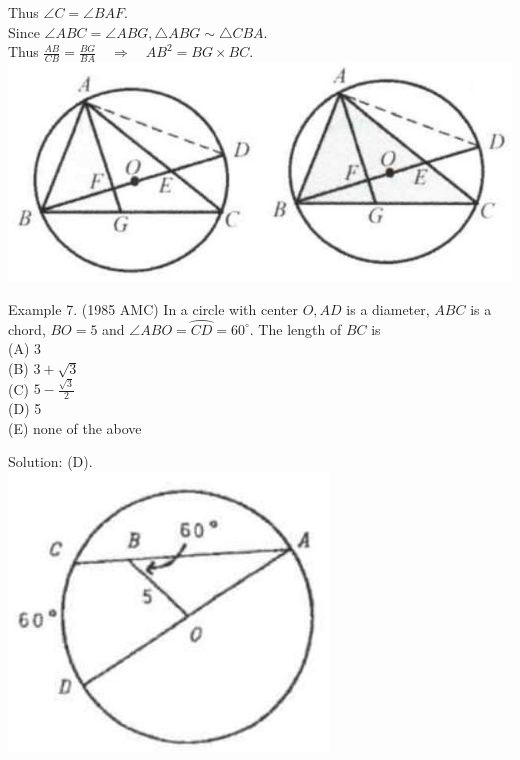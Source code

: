 \documentclass[10pt]{article}
\begin{document}
Thus \(\angle C=\angle B A F\).\\
Since \(\angle A B C=\angle A B G, \triangle A B G \sim \triangle C B A\).\\
Thus \(\frac{A B}{C B}=\frac{B G}{B A} \quad \Rightarrow \quad A B^{2}=B G \times B C\).\\
\includegraphics[max width=\textwidth, center]{2025_04_17_97bc1f7e44d93c271a88g-166}

Example 7. (1985 AMC) In a circle with center \(O, A D\) is a diameter, \(A B C\) is a chord, \(B O=5\) and \(\angle A B O=\wideparen{C D}=60^{\circ}\). The length of \(B C\) is\\
(A) 3\\
(B) \(3+\sqrt{3}\)\\
(C) \(5-\frac{\sqrt{3}}{2}\)\\
(D) 5\\
(E) none of the above

Solution: (D).\\
\includegraphics[max width=\textwidth, center]{2025_04_17_97bc1f7e44d93c271a88g-166(1)}
\end{document}
